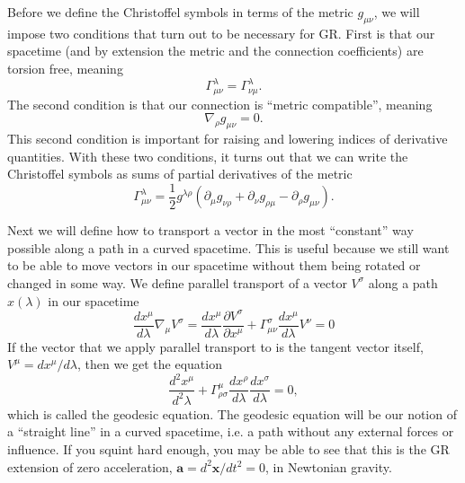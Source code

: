 \begin{bibunit}[unsrtnat]
Before we define the Christoffel symbols in terms of the metric $g_{\mu\nu}$, we
will impose two conditions that turn out to be necessary for GR. First is that
our spacetime (and by extension the metric and the connection coefficients) are
torsion free, meaning
\begin{equation}
   \Gamma^\lambda_{\mu\nu} = \Gamma^\lambda_{\nu\mu}. 
\end{equation}
The second condition is that our connection is ``metric compatible'', meaning
\begin{equation}
   \nabla_\rho g_{\mu\nu} = 0.
\end{equation}
This second condition is important for raising and lowering indices of
derivative quantities. With these two conditions, it turns out that we can write
the Christoffel symbols as sums of partial derivatives of the metric
\begin{equation}\label{eq:christoffel-symbols}
   \Gamma^\lambda_{\mu\nu} = \frac{1}{2}g^{\lambda\rho}\left(
      \partial_\mu g_{\nu\rho} + \partial_\nu g_{\rho\mu} - \partial_\rho g_{\mu\nu}
      \right).
\end{equation}

Next we will define how to transport a vector in the most ``constant'' way
possible along a path in a curved spacetime. This is useful because we still
want to be able to move vectors in our spacetime without them being rotated or
changed in some way. We define parallel transport of a vector $V^\sigma$ along a
path $x(\lambda)$ in our spacetime
\begin{equation}
   \frac{dx^\mu}{d\lambda}\nabla_\mu V^\sigma =
   \frac{dx^\mu}{d\lambda}\frac{\partial V^\sigma}{\partial x^\mu} + 
   \Gamma^\sigma_{\mu\nu}\frac{dx^\mu}{d\lambda}V^\nu = 0
\end{equation}
If the vector that we apply parallel transport to is the tangent vector itself,
$V^\mu=dx^\mu/d\lambda$, then we get the equation
\begin{equation}\label{eq:geodesic}
   \frac{d^2x^\mu}{d^2\lambda} +
   \Gamma^\mu_{\rho\sigma}\frac{dx^\rho}{d\lambda}\frac{dx^\sigma}{d\lambda} = 0,
\end{equation}
which is called the geodesic equation. The geodesic equation will be our notion
of a ``straight line'' in a curved spacetime, i.e. a path without any external
forces or influence. If you squint hard enough, you may be able to see that this
is the GR extension of zero acceleration, $\mathbf{a} = d^2\mathbf{x}/dt^2 = 0$,
in Newtonian gravity.


\end{bibunit}
